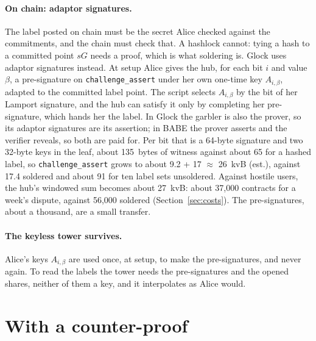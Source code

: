 \documentclass[11pt]{article}
\newcommand{\tx}[1]{\texttt{#1}}
\begin{document}
\paragraph{On chain: adaptor signatures.} The label posted on chain
must be the secret Alice checked against the commitments, and the
chain must check that. A hashlock cannot: tying a hash to a committed
point $s G$ needs a proof, which is what soldering is. Glock uses
adaptor signatures instead. At setup Alice gives the hub, for each bit
$i$ and value $\beta$, a pre-signature on \tx{challenge\_assert} under
her own one-time key $A_{i,\beta}$, adapted to the committed label point.
The script selects $A_{i,\beta}$ by the bit of her Lamport signature, and
the hub can satisfy it only by completing her pre-signature, which
hands her the label. In Glock the garbler is also the prover, so its
adaptor signatures are its assertion; in BABE the prover asserts and the
verifier reveals, so both are paid for. Per bit that is a 64-byte
signature and two 32-byte keys in the leaf, about 135~bytes of witness
against about 65 for a hashed label, so \tx{challenge\_assert} grows to
about 9.2 + 17 $\approx$ 26~kvB (est.), against 17.4 soldered and about
91 for ten label sets unsoldered. Against hostile users, the hub's
windowed sum becomes about 27~kvB: about 37,000 contracts for a week's
dispute, against 56,000 soldered (Section~\ref{sec:costs}). The
pre-signatures, about a thousand, are a small transfer.

\paragraph{The keyless tower survives.} Alice's keys $A_{i,\beta}$ are
used once, at setup, to make the pre-signatures, and never again. To
read the labels the tower needs the pre-signatures and the opened
shares, neither of them a key, and it interpolates as Alice would.

\section{With a counter-proof}
\label{sec:counter}
\end{document}
